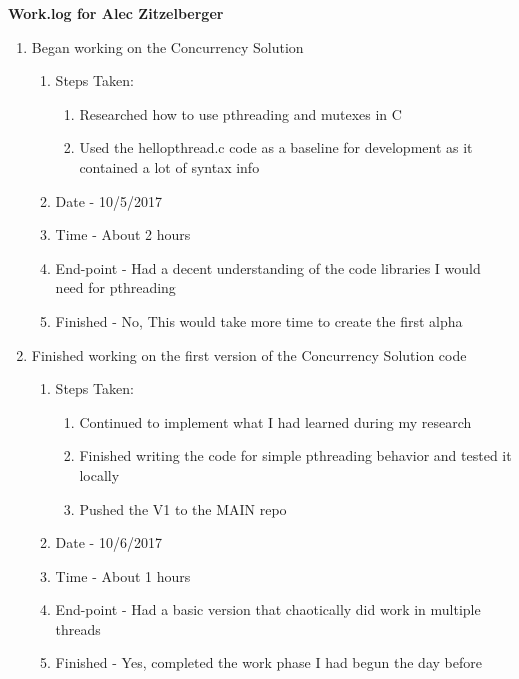 \documentclass[letterpaper,10pt,fleqn]{article}
\begin{document}
\begin{enumerate}
\textbf{Work.log for Alec Zitzelberger}
\begin{enumerate}	
	\item Began working on the Concurrency Solution
		\begin{enumerate}
			\item Steps Taken:
				\begin{enumerate}
					\item Researched how to use pthreading and mutexes in C
					\item Used the hellopthread.c code as a baseline for development as it contained a lot of syntax info
				\end{enumerate}
			\item Date - 10/5/2017
			\item Time - About 2 hours
			\item End-point - Had a decent understanding of the code libraries I would need for pthreading
			\item Finished - No, This would take more time to create the first alpha
		\end {enumerate}
		
	\item Finished working on the first version of the Concurrency Solution code
		\begin{enumerate}
			\item Steps Taken:
				\begin{enumerate}
					\item Continued to implement what I had learned during my research
					\item Finished writing the code for simple pthreading behavior and tested it locally
					\item Pushed the V1 to the MAIN repo
				\end{enumerate}
			\item Date - 10/6/2017
			\item Time - About 1 hours
			\item End-point - Had a basic version that chaotically did work in multiple threads
			\item Finished - Yes, completed the work phase I had begun the day before
		\end {enumerate}
		

\end{enumerate}
\end{enumerate}
\end{document}
